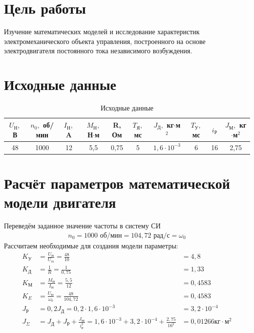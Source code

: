 \documentclass[fleqn, a4paper, 11pt, russian]{article}
\begin{document}
    
    \section*{Цель работы}
    Изучение математических моделей и исследование характеристик электромеханического объекта управления, построенного на основе электродвигателя постоянного тока независимого возбуждения.
    \section*{Исходные данные}
    \begin{table}[ht!]
    	\caption{Исходные данные}
    	\begin{tabular}{| c | c | c | c | c | c | c | c | c | c |}
    		\hline
    		\makecell{$U_\text{Н},$\\В} & \makecell{$n_0,$\\об/мин} & \makecell{$I_\text{Н},$\\A} & \makecell{$M_\text{Н},$\\Н$\cdot$м} & \makecell{R,\\Ом} & \makecell{$T_\text{Я},$\\мс} & \makecell{$J_\text{Д},$\\кг$\cdot$м$^2$} & \makecell{$T_\text{У},$\\мс} & $i_\text{Р}$ & \makecell{$J_\text{М},$\\кг$\cdot$м$^2$} \\
    		\hline
    		48 & 1000 & 12 & 5,5 & 0,75 & 5 & $1,6\cdot10^{-3}$ & 6 & 16 & 2,75\\
    		\hline
    	\end{tabular}
    \end{table}
    \clearpage
    \section{Расчёт параметров математической модели двигателя}
    Переведём заданное значение частоты в систему СИ
    \begin{align}
		n_0 = 1000 \text{ об/мин} = 104,72 \text{ рад/с} = \omega_0
    \end{align}
    Рассчитаем необходимые для создания модели параметры:
    \begin{align}
    	K_\text{У} &= \frac{U_\text{Н}}{U_m} = \frac{48}{10} &= 4,8\\
    	K_\text{Д} &= \frac{1}{R} = \frac{1}{0,75} &= 1,33\\
    	K_\text{М} &= \frac{M_\text{Н}}{I_\text{Н}} = \frac{5,5}{12} &= 0,4583\\
    	K_E &= \frac{U_\text{Н}}{\omega_0} = \frac{48}{104,72} &= 0,4583\\
    	J_\text{Р} &= 0,2J_\text{Д} = 0,2 \cdot 1,6\cdot10^{-3} &= 3,2\cdot10^{-4}\\
    	J_\Sigma &= J_\text{Д} + J_\text{Р} + \frac{J_\text{М}}{i_\text{Р}^2} = 1,6\cdot10^{-3} + 3,2\cdot10^{-4} + \frac{2,75}{16^2} &= 0,01266 \text{кг}\cdot\text{м}^2
	\end{align}
	\clearpage
\end{document}
